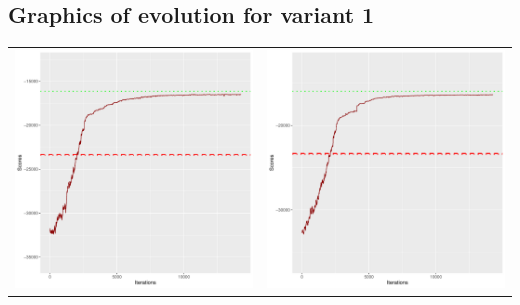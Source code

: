 \documentclass[]{scrartcl}
\begin{document}
\subsection{Graphics of evolution for variant 1}

\begin{table}[h!]
\begin{tabular}{cc}
\includegraphics[scale = 0.4]{./figs/win95pts/v1/25/boundsEvolution-14252.pdf} & 
\includegraphics[scale = 0.4]{./figs/win95pts/v1/50/boundsEvolution-14252.pdf} \\

\end{tabular}
\end{table}
\end{document}
